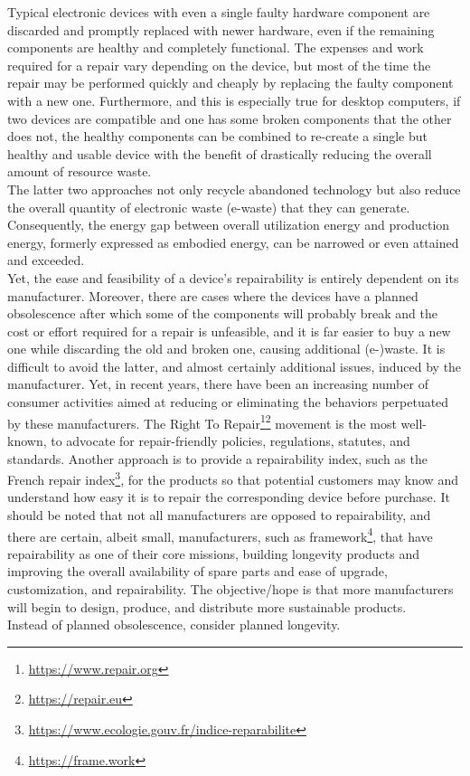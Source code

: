 Typical electronic devices with even a single faulty hardware component are
discarded and promptly replaced with newer hardware, even if the remaining components
are healthy and completely functional. The expenses and work required for a
repair vary depending on the device, but most of the time the repair may be performed
quickly and cheaply by replacing the faulty component with a new one.
Furthermore, and this is especially true for desktop computers, if two devices
are compatible and one has some broken components that the other does not, the healthy
components can be combined to re-create a single but healthy and usable device with
the benefit of drastically reducing the overall amount of resource waste. \\ %
The latter two approaches not only recycle abandoned technology but also reduce the
overall quantity of electronic waste (e-waste) that they can generate.
Consequently, the energy gap between overall utilization energy and production energy,
formerly expressed as embodied energy, can be narrowed or even attained and exceeded.
\\ %
Yet, the ease and feasibility of a device's repairability is entirely dependent
on its manufacturer. Moreover, there are cases where the devices have a planned
obsolescence after which some of the components will probably break and the cost
or effort required for a repair is unfeasible, and it is far easier to buy a new
one while discarding the old and broken one, causing additional (e-)waste. It is
difficult to avoid the latter, and almost certainly additional issues, induced by
the manufacturer. Yet, in recent years, there have been an increasing number of
consumer activities aimed at reducing or eliminating the behaviors perpetuated
by these manufacturers. The Right To Repair\footnote{\url{https://www.repair.org}}\footnote{\url{https://repair.eu}}
movement is the most well-known, to advocate for repair-friendly policies, regulations,
statutes, and standards. Another approach is to provide a repairability index, such
as the French repair index\footnote{\url{https://www.ecologie.gouv.fr/indice-reparabilite}},
for the products so that potential customers may know and understand how easy it
is to repair the corresponding device before purchase. It should be noted that not
all manufacturers are opposed to repairability, and there are certain, albeit small,
manufacturers, such as framework\footnote{\url{https://frame.work}}, that have
repairability as one of their core missions, building longevity products and improving
the overall availability of spare parts and ease of upgrade, customization, and repairability.
The objective/hope is that more manufacturers will begin to design, produce, and
distribute more sustainable products. \\ %
Instead of planned obsolescence, consider planned longevity. \\ %

